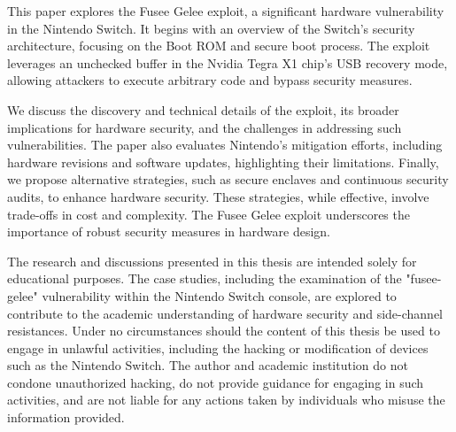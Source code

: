 \beforeabstract
{}

This paper explores the Fusee Gelee exploit, a significant hardware vulnerability in the Nintendo Switch. It begins with an overview of the Switch's security architecture, focusing on the Boot ROM and secure boot process. The exploit leverages an unchecked buffer in the Nvidia Tegra X1 chip's USB recovery mode, allowing attackers to execute arbitrary code and bypass security measures.

We discuss the discovery and technical details of the exploit, its broader implications for hardware security, and the challenges in addressing such vulnerabilities. The paper also evaluates Nintendo's mitigation efforts, including hardware revisions and software updates, highlighting their limitations. Finally, we propose alternative strategies, such as secure enclaves and continuous security audits, to enhance hardware security. These strategies, while effective, involve trade-offs in cost and complexity. The Fusee Gelee exploit underscores the importance of robust security measures in hardware design.


The research and discussions presented in this thesis are intended solely for educational purposes. The case studies, including the examination of the "fusee-gelee" vulnerability within the Nintendo Switch console, are explored to contribute to the academic understanding of hardware security and side-channel resistances. Under no circumstances should the content of this thesis be used to engage in unlawful activities, including the hacking or modification of devices such as the Nintendo Switch. The author and academic institution do not condone unauthorized hacking, do not provide guidance for engaging in such activities, and are not liable for any actions taken by individuals who misuse the information provided.

\afterpreface\afterabstract